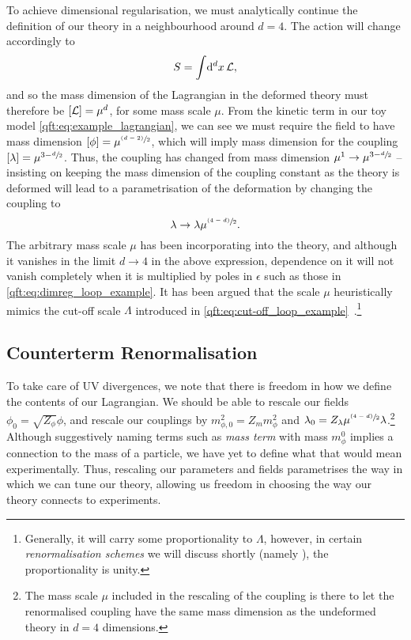 \documentclass[../main.tex]{subfiles}
\begin{document}
To achieve dimensional regularisation, we must analytically continue the definition of our theory in a neighbourhood around \(d = 4\).
The action will change accordingly to
\begin{equation}
  S = \int \!\mathrm{d}^d x\, \mathcal{L},
\end{equation}
and so the mass dimension of the Lagrangian in the deformed theory must therefore be \(\left[\mathcal{L}\right] = \mu^d\), for some mass scale \(\mu\).
From the kinetic term in our toy model \cref{qft:eq:example_lagrangian}, we can see we must require the field to have mass dimension \(\left[\phi\right] = \mu^{\sfrac{(d-2)}{2}}\), which will imply mass dimension for the coupling \(\left[\lambda\right] = \mu^{3-\sfrac{d}{2}}\).
Thus, the coupling has changed from mass dimension \(\mu^1 \to \mu^{3-\sfrac{d}{2}}\) -- insisting on keeping the mass dimension of the coupling constant as the theory is deformed will lead to a parametrisation of the deformation by changing the coupling to
\begin{equation}
  \lambda \to \lambda \mu^{\sfrac{(4-d)}{2}}.
\end{equation}
The arbitrary mass scale \(\mu\) has been incorporating into the theory, and although it vanishes in the limit \(d \to 4\) in the above expression, dependence on it will not vanish completely when it is multiplied by poles in \(\epsilon\) such as those in \cref{qft:eq:dimreg_loop_example}.
It has been argued that the scale \(\mu\) heuristically mimics the cut-off scale \(\Lambda\) introduced in \cref{qft:eq:cut-off_loop_example}~\cite{Collins:2011zzd}.\footnote{Generally, it will carry some proportionality to \(\Lambda\), however, in certain \emph{renormalisation schemes} we will discuss shortly (namely \MSbar{}), the proportionality is unity.}





\subsection{Counterterm Renormalisation}
\label{qft:subsec:counterterms}
To take care of UV divergences, we note that there is freedom in how we define the contents of our Lagrangian.
We should be able to rescale our fields \(\phi_0 = \sqrt{Z_\phi} \phi\), and rescale our couplings by \(m_{\phi,0}^2 = Z_m m_\phi^2\) and \(\lambda_0 = Z_\lambda \mu^{\sfrac{(4-d)}{2}} \lambda\).\footnote{The mass scale \(\mu\) included in the rescaling of the coupling is there to let the renormalised coupling have the same mass dimension as the undeformed theory in \(d = 4\) dimensions.}
Although suggestively naming terms such as \emph{mass term} with mass \(m_\phi^0\) implies a connection to the mass of a particle, we have yet to define what that would mean experimentally.
Thus, rescaling our parameters and fields parametrises the way in which we can tune our theory, allowing us freedom in choosing the way our theory connects to experiments.
\end{document}
